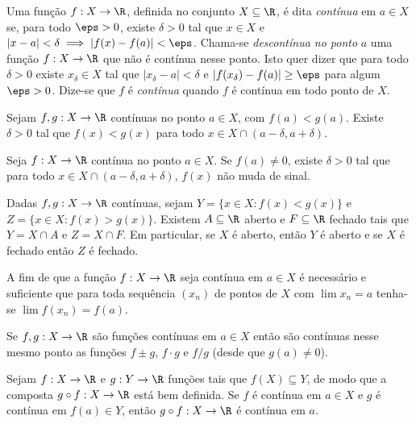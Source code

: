 \documentclass{article}
\begin{document}
\begin{defn}
    Uma função \(f: X \to \R\), definida no conjunto \(X \subseteq \R\), é dita \emph{contínua} em \(a \in X\) se, para todo \(\eps > 0\), existe \(\delta > 0\) tal que \(x \in X\) e \(|x - a| < \delta \implies |f(x) - f(a)| < \eps\). Chama-se \emph{descontínua no ponto} \(a\) uma função \(f: X \to \R\) que não é contínua nesse ponto. Isto quer dizer que para todo \(\delta > 0\) existe \(x_\delta \in X\) tal que \(|x_\delta - a| < \delta\) e \(|f(x_\delta) - f(a)| \geq \eps\) para algum \(\eps > 0\).
    Dize-se que \(f\) é \emph{contínua} quando \(f\) é contínua em todo ponto de \(X\).
\end{defn}

\begin{prop}
    Sejam \(f, g: X \to \R\) contínuas no ponto \(a \in X\), com \(f(a) < g(a)\). Existe \(\delta > 0\) tal que \(f(x) < g(x)\) para todo \(x \in X \cap (a-\delta, a+\delta)\).
\end{prop}

\begin{cor}
    Seja \(f: X \to \R\) contínua no ponto \(a \in X\). Se \(f(a) \neq 0\), existe \(\delta > 0\) tal que para todo \(x \in X \cap (a-\delta, a+\delta)\), \(f(x)\) não muda de sinal.
\end{cor}

\begin{cor}
    Dadas \(f, g: X \to \R\) contínuas, sejam \(Y = \{x \in X : f(x) < g(x)\}\) e \(Z = \{x \in X : f(x) > g(x)\}\). Existem \(A \subseteq \R\) aberto e \(F \subseteq \R\) fechado tais que \(Y = X \cap A\) e \(Z = X \cap F\). Em particular, se \(X\) é aberto, então \(Y\) é aberto e se \(X\) é fechado então \(Z\) é fechado.
\end{cor}

\begin{prop}
    A fim de que a função \(f: X \to \R\) seja contínua em \(a \in X\) é necessário e suficiente que para toda sequência \((x_n)\) de pontos de \(X\) com \(\lim x_n = a\) tenha-se \(\lim f(x_n) = f(a)\).
\end{prop}

\begin{cor}
    Se \(f, g: X \to \R\) são funções contínuas em \(a \in X\) então são contínuas nesse mesmo ponto as funções \(f \pm g\), \(f \cdot g\) e \(f / g\) (desde que \(g(a) \neq 0\)).
\end{cor}

\begin{prop} 
    Sejam \(f: X \to \R\) e \(g: Y \to \R\) funções tais que \(f(X) \subseteq Y\), de modo que a composta \(g \circ f: X \to \R\) está bem definida. Se \(f\) é contínua em \(a \in X\) e \(g\) é contínua em \(f(a) \in Y\), então \(g \circ f: X \to \R\) é contínua em \(a\).
    
\end{prop}
\end{document}
